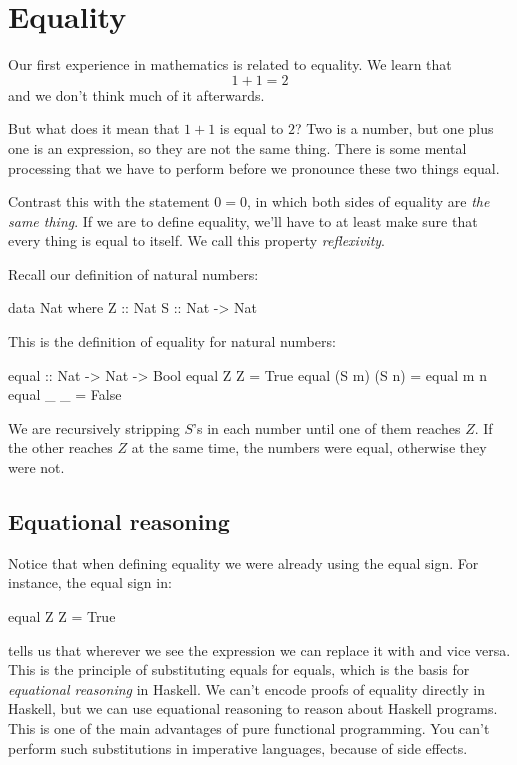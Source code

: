 \documentclass[DaoFP]{subfiles}
\begin{document}
\section{Equality}

Our first experience in mathematics is related to equality. We learn that 
\[1+1=2\] 
and we don't think much of it afterwards. 

But what does it mean that $1+1$ is equal to $2$? Two is a number, but one plus one is an expression, so they are not the same thing. There is some mental processing that we have to perform before we pronounce these two things equal. 

Contrast this with the statement $0 = 0$, in which both sides of equality are \emph{the same thing}. If we are to define equality, we'll have to at least make sure that every thing is equal to itself. We call this property \emph{reflexivity}. 

Recall our definition of natural numbers:
\begin{haskell}
data Nat where
  Z :: Nat
  S :: Nat -> Nat
\end{haskell}
This is the definition of equality for natural numbers:
\begin{haskell}
equal :: Nat -> Nat -> Bool
equal Z Z = True
equal (S m) (S n) = equal m n
equal _ _ = False
\end{haskell}
We are recursively stripping $S$'s in each number until one of them reaches $Z$. If the other reaches $Z$ at the same time, the numbers were equal, otherwise they were not. 

\subsection{Equational reasoning}

Notice that when defining equality we were already using the equal sign. For instance, the equal sign in:
\begin{haskell}
equal Z Z = True
\end{haskell}
tells us that wherever we see the expression  we can replace it with  and vice versa. This is the principle of substituting equals for equals, which is the basis for \emph{equational reasoning} in Haskell. We can't encode proofs of equality directly in Haskell, but we can use equational reasoning to reason about Haskell programs. This is one of the main advantages of pure functional programming. You can't perform such substitutions in imperative languages, because of side effects.
\end{document}
